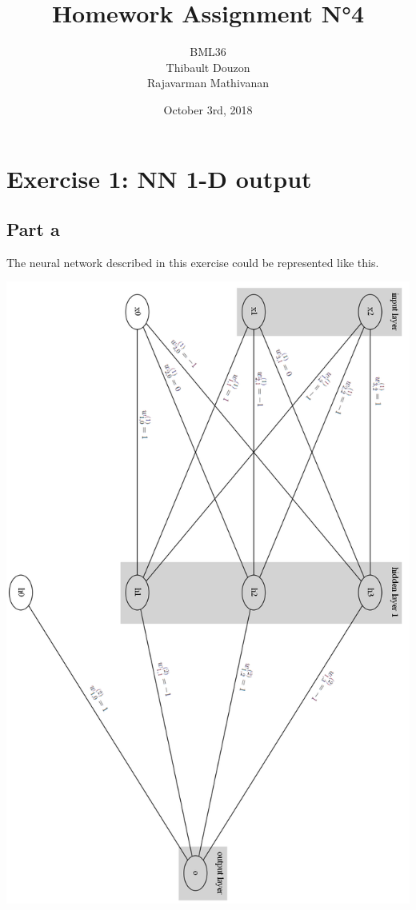 \documentclass[a4paper, 10pt]{article}
\title{Homework Assignment N°4}
\author{BML36\\Thibault Douzon\\Rajavarman Mathivanan}
\date{October 3rd, 2018}
\begin{document}
\maketitle

\pagebreak

\tableofcontents

\pagebreak
\section{Exercise 1: NN 1-D output}
\subsection{Part a}
The neural network described in this exercise could be represented like this.
\begin{center}
\includegraphics[scale=0.5]{ex1_graph_export}
\end{center}
\end{document}
